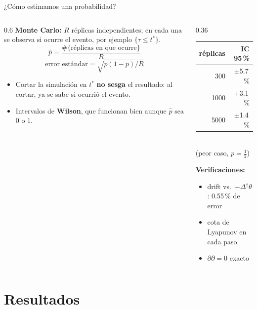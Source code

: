 \documentclass[aspectratio=169,11pt]{beamer}
\begin{document}
\begin{frame}{¿Cómo estimamos una probabilidad?}
  \begin{columns}[T]
    \begin{column}{0.6\textwidth}
      \small
      \textbf{Monte Carlo:} $R$ réplicas independientes; en cada una se observa si ocurre el evento, por ejemplo $\{\tau\le t^*\}$.
      \[
        \hat p=\frac{\#\{\text{réplicas en que ocurre}\}}{R}
      \]
      \[
        \text{error estándar}=\sqrt{p(1-p)/R}
      \]
      \begin{itemize}
        \item Cortar la simulación en $t^*$ \textbf{no sesga} el resultado: al cortar, ya se sabe si ocurrió el evento.
        \item Intervalos de \textbf{Wilson}, que funcionan bien aunque $\hat p$ sea 0 o 1.
      \end{itemize}
    \end{column}
    \begin{column}{0.36\textwidth}
      \small
      \begin{tabular}{@{}rr@{}}
        \toprule
        réplicas & IC 95\,\% \\
        \midrule
        300 & $\pm$5.7\,\% \\
        1000 & $\pm$3.1\,\% \\
        5000 & $\pm$1.4\,\% \\
        \bottomrule
      \end{tabular}\\
      {\scriptsize (peor caso, $p=\tfrac12$)}
      \vspace{3mm}

      \textbf{Verificaciones:}
      \begin{itemize}
        \item drift vs.\ $-\Delta^\uparrow\theta$: 0.55\,\% de error
        \item cota de Lyapunov en cada paso
        \item $\partial\partial=0$ exacto
      \end{itemize}
    \end{column}
  \end{columns}
\end{frame}

\section{Resultados}
\end{document}
